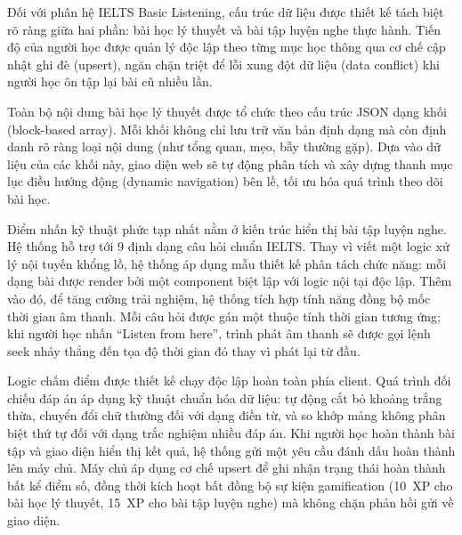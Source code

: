 \begin{sloppypar}
Đối với phân hệ IELTS Basic Listening, cấu trúc dữ liệu được thiết kế tách biệt rõ ràng giữa hai phần: bài học lý thuyết và bài tập luyện nghe thực hành. Tiến độ của người học được quản lý độc lập theo từng mục học thông qua cơ chế cập nhật ghi đè (upsert), ngăn chặn triệt để lỗi xung đột dữ liệu (data conflict) khi người học ôn tập lại bài cũ nhiều lần.

Toàn bộ nội dung bài học lý thuyết được tổ chức theo cấu trúc JSON dạng khối (block-based array). Mỗi khối không chỉ lưu trữ văn bản định dạng mà còn định danh rõ ràng loại nội dung (như tổng quan, mẹo, bẫy thường gặp). Dựa vào dữ liệu của các khối này, giao diện web sẽ tự động phân tích và xây dựng thanh mục lục điều hướng động (dynamic navigation) bên lề, tối ưu hóa quá trình theo dõi bài học.
\end{sloppypar}

\begin{sloppypar}
Điểm nhấn kỹ thuật phức tạp nhất nằm ở kiến trúc hiển thị bài tập luyện nghe. Hệ thống hỗ trợ tới 9 định dạng câu hỏi chuẩn IELTS. Thay vì viết một logic xử lý nội tuyến khổng lồ, hệ thống áp dụng mẫu thiết kế phân tách chức năng: mỗi dạng bài được render bởi một component biệt lập với logic nội tại độc lập. Thêm vào đó, để tăng cường trải nghiệm, hệ thống tích hợp tính năng đồng bộ mốc thời gian âm thanh. Mỗi câu hỏi được gán một thuộc tính thời gian tương ứng; khi người học nhấn ``Listen from here'', trình phát âm thanh sẽ được gọi lệnh seek nhảy thẳng đến tọa độ thời gian đó thay vì phát lại từ đầu.
\end{sloppypar}

\begin{sloppypar}
Logic chấm điểm được thiết kế chạy độc lập hoàn toàn phía client. Quá trình đối chiếu đáp án áp dụng kỹ thuật chuẩn hóa dữ liệu: tự động cắt bỏ khoảng trắng thừa, chuyển đổi chữ thường đối với dạng điền từ, và so khớp mảng không phân biệt thứ tự đối với dạng trắc nghiệm nhiều đáp án. Khi người học hoàn thành bài tập và giao diện hiển thị kết quả, hệ thống gửi một yêu cầu đánh dấu hoàn thành lên máy chủ. Máy chủ áp dụng cơ chế upsert để ghi nhận trạng thái hoàn thành bất kể điểm số, đồng thời kích hoạt bất đồng bộ sự kiện gamification (10~XP cho bài học lý thuyết, 15~XP cho bài tập luyện nghe) mà không chặn phản hồi gửi về giao diện.
\end{sloppypar}

